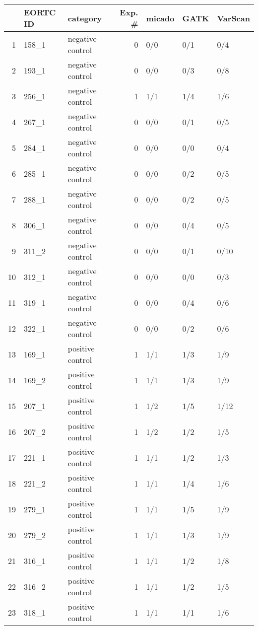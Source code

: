 \begin{table}[ht]
\centering
\begin{tabular}{rllrlll}
  \hline
 & EORTC ID & category & Exp. \# & micado & GATK & VarScan \\ 
  \hline
1 & 158\_1 & negative control &   0 & 0/0 & 0/1 & 0/4 \\ 
  2 & 193\_1 & negative control &   0 & 0/0 & 0/3 & 0/8 \\ 
  3 & 256\_1 & negative control &   1 & 1/1 & 1/4 & 1/6 \\ 
  4 & 267\_1 & negative control &   0 & 0/0 & 0/1 & 0/5 \\ 
  5 & 284\_1 & negative control &   0 & 0/0 & 0/0 & 0/4 \\ 
  6 & 285\_1 & negative control &   0 & 0/0 & 0/2 & 0/5 \\ 
  7 & 288\_1 & negative control &   0 & 0/0 & 0/2 & 0/5 \\ 
  8 & 306\_1 & negative control &   0 & 0/0 & 0/4 & 0/5 \\ 
  9 & 311\_2 & negative control &   0 & 0/0 & 0/1 & 0/10 \\ 
  10 & 312\_1 & negative control &   0 & 0/0 & 0/0 & 0/3 \\ 
  11 & 319\_1 & negative control &   0 & 0/0 & 0/4 & 0/6 \\ 
  12 & 322\_1 & negative control &   0 & 0/0 & 0/2 & 0/6 \\ 
  13 & 169\_1 & positive control &   1 & 1/1 & 1/3 & 1/9 \\ 
  14 & 169\_2 & positive control &   1 & 1/1 & 1/3 & 1/9 \\ 
  15 & 207\_1 & positive control &   1 & 1/2 & 1/5 & 1/12 \\ 
  16 & 207\_2 & positive control &   1 & 1/2 & 1/2 & 1/5 \\ 
  17 & 221\_1 & positive control &   1 & 1/1 & 1/2 & 1/3 \\ 
  18 & 221\_2 & positive control &   1 & 1/1 & 1/4 & 1/6 \\ 
  19 & 279\_1 & positive control &   1 & 1/1 & 1/5 & 1/9 \\ 
  20 & 279\_2 & positive control &   1 & 1/1 & 1/3 & 1/9 \\ 
  21 & 316\_1 & positive control &   1 & 1/1 & 1/2 & 1/8 \\ 
  22 & 316\_2 & positive control &   1 & 1/1 & 1/2 & 1/5 \\ 
  23 & 318\_1 & positive control &   1 & 1/1 & 1/1 & 1/6 \\ 

\end{tabular}
\end{table}
